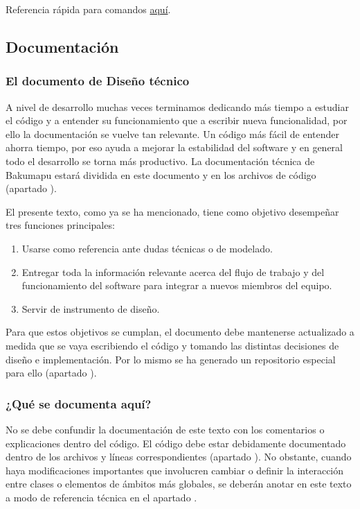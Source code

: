 Referencia rápida para comandos  \href{https://rogerdudler.github.io/git-guide}{aquí}.


\subsection{Documentación}\label{flujo:documentacion}

\subsubsection{El documento de Diseño técnico}\label{flujo:documento-de-diseno}
A nivel de desarrollo muchas veces terminamos dedicando más tiempo a estudiar el código y a entender su funcionamiento que a escribir nueva funcionalidad, por ello la documentación se vuelve tan relevante. Un código más fácil de entender ahorra tiempo, por eso ayuda a mejorar la estabilidad del software y en general todo el desarrollo se torna más productivo. La documentación técnica de Bakumapu estará dividida en este documento y en los archivos de código (apartado ).

El presente texto, como ya se ha mencionado, tiene como objetivo desempeñar tres funciones principales:
\begin{enumerate}[noitemsep]
	\item Usarse como referencia ante dudas técnicas o de modelado.
	\item Entregar toda la información relevante acerca del flujo de trabajo y del funcionamiento del software para integrar a nuevos miembros del equipo.
	\item Servir de instrumento de diseño.
\end{enumerate}

Para que estos objetivos se cumplan, el documento debe mantenerse actualizado a medida que se vaya escribiendo el código y tomando las distintas decisiones de diseño e implementación. Por lo mismo se ha generado un repositorio especial para ello (apartado ). 

\subsubsection*{¿Qué se documenta aquí?}
No se debe confundir la documentación de este texto con los comentarios o explicaciones dentro del código. El código debe estar debidamente documentado dentro de los archivos y líneas correspondientes (apartado ). No obstante, cuando haya modificaciones importantes que involucren cambiar o definir la interacción entre clases o elementos de ámbitos más globales, se deberán anotar en este texto a modo de referencia técnica en el apartado .

